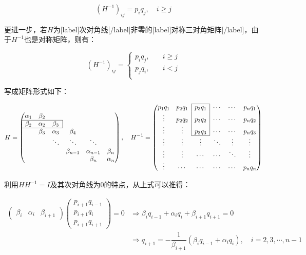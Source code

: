 \documentclass[UTF8,nofonts]{ctexart}
\begin{document}
\[
(H^{-1})_{ij}=p_iq_j,\quad i \geq j
\]

更进一步，若$H$为[label]次对角线[/label]非零的[label]对称三对角矩阵[/label]，由于$H^{-1}$也是对称矩阵，则有：

\[
(H^{-1})_{ij}=
\begin{cases}
p_iq_j,&\quad i \geq j\\
p_jq_i,&\quad i < j\\
\end{cases}
\]

写成矩阵形式如下：

\[
H=
\begin{pmatrix}
\alpha_1 & \beta_2 & & & &\\
\cline{1-3}
\beta_2 & \alpha_2 & \multicolumn{1}{c|}{\multirow{1}{*}{$\beta_3$}} & & &\\
\cline{1-3}
& \beta_3 & \alpha_3 & \beta_4 & & \\
& & \ddots & \ddots & \ddots & \\
& & & \beta_{n-1} & \alpha_{n-1} & \beta_n \\
& & & & \beta_n & \alpha_n
\end{pmatrix},\quad
H^{-1}=
\begin{pmatrix}
\cline{3-3}
p_1q_1 & p_2q_1 & \multicolumn{1}{|c|}{\multirow{1}{*}{$p_3q_1$}} & \cdots & \cdots & p_nq_1 \\
\vdots & p_2q_2 & \multicolumn{1}{|c|}{\multirow{1}{*}{$p_3q_2$}} & \cdots & \cdots & p_{n}q_2 \\
\vdots & \vdots & \multicolumn{1}{|c|}{\multirow{1}{*}{$p_3q_3$}} & \cdots & \cdots & p_{n}q_3 \\
\cline{3-3}
\vdots & \vdots & \vdots & \ddots & \vdots & \vdots \\
\vdots & \vdots & \cdots & \cdots & \ddots & \vdots \\
\vdots & \cdots & \cdots & \cdots & \cdots & p_nq_n
\end{pmatrix}
\]

利用$HH^{-1}=I$及其次对角线为$0$的特点，从上式可以推得：

\begin{align*}
\begin{pmatrix}\beta_i & \alpha_i & \beta_{i+1} \end{pmatrix}
\begin{pmatrix}p_{i+1}q_{i-1} \\ p_{i+1}q_{i} \\ p_{i+1}q_{i+1}\end{pmatrix}=0
&\Longrightarrow \beta_iq_{i-1}+\alpha_iq_i+\beta_{i+1}q_{i+1}=0 \\
&\Longrightarrow q_{i+1}=-\dfrac{1}{\beta_{i+1}}(\beta_iq_{i-1}+\alpha_iq_i),\quad i=2,3,\cdots,n-1
\end{align*}
\end{document}
